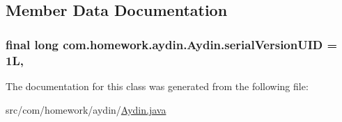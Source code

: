 \subsection{Member Data Documentation}
\subsubsection[{\texorpdfstring{serial\+Version\+U\+ID}{serialVersionUID}}]{\setlength{\rightskip}{0pt plus 5cm}final long com.\+homework.\+aydin.\+Aydin.\+serial\+Version\+U\+ID = 1L\hspace{0.3cm}{\ttfamily [static]}, {\ttfamily [private]}}\hypertarget{classcom_1_1homework_1_1aydin_1_1_aydin_a36327d610cbc4ac41f7c9f3bf5589f23}{}\label{classcom_1_1homework_1_1aydin_1_1_aydin_a36327d610cbc4ac41f7c9f3bf5589f23}


The documentation for this class was generated from the following file\+:\begin{DoxyCompactItemize}
\item 
src/com/homework/aydin/\hyperlink{_aydin_8java}{Aydin.\+java}\end{DoxyCompactItemize}
